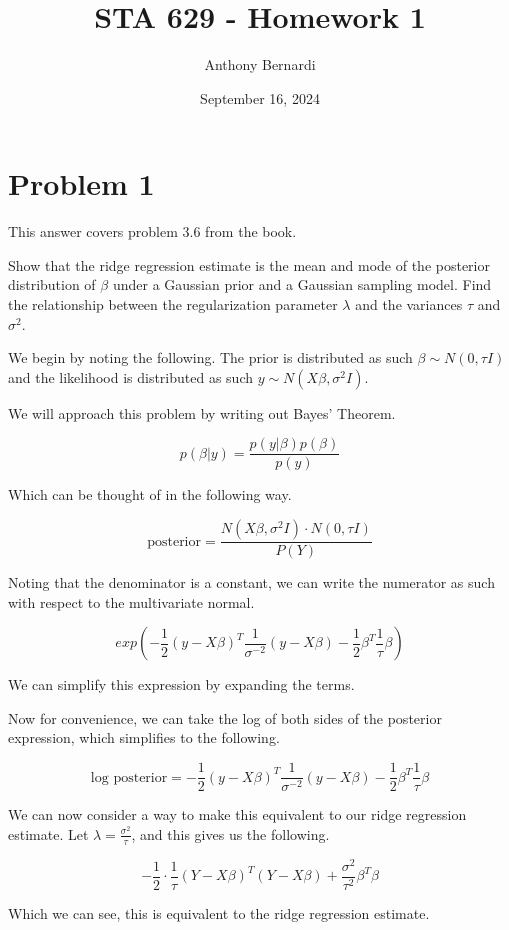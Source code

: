\documentclass[12pt, letterpaper]{article}
\title{STA 629 - Homework 1}
\author{Anthony Bernardi}
\date{September 16, 2024}
\begin{document}
\maketitle

\section{Problem 1} 

This answer covers problem 3.6 from the book. 

Show that the ridge regression estimate is the mean and mode of the posterior distribution of $\beta$ under a Gaussian prior and a Gaussian sampling model. Find the relationship between the regularization parameter $\lambda$ and the variances $\tau$ and $\sigma^2$. 

We begin by noting the following. The prior is distributed as such $\beta \sim N(0, \tau I)$ and the likelihood is distributed as such $y \sim N(X\beta, \sigma^2I)$.

We will approach this problem by writing out Bayes' Theorem. 

\[
p(\beta | y) = \frac{p(y | \beta) p(\beta)}{p(y)}
\]

Which can be thought of in the following way. 

\[
\text{posterior} = \frac{N(X\beta, \sigma^2 I) \cdot N(0, \tau I)}{P(Y)}
\] 

Noting that the denominator is a constant, we can write the numerator as such with respect to the multivariate normal. 

\[
exp(-\frac{1}{2} (y - X\beta)^T \frac{1}{\sigma^{-2}} (y - X\beta) - \frac{1}{2} \beta^T \frac{1}{\tau} \beta)
\]

We can simplify this expression by expanding the terms. 

Now for convenience, we can take the log of both sides of the posterior expression, which simplifies to the following.  

\[
\text{log posterior} = -\frac{1}{2} (y - X\beta)^T \frac{1}{\sigma^{-2}} (y - X\beta) - \frac{1}{2} \beta^T \frac{1}{\tau} \beta
\]

We can now consider a way to make this equivalent to our ridge regression estimate. Let $\lambda = \frac{\sigma^2}{\tau}$, and this gives us the following. 

\[
-\frac{1}{2} \cdot \frac{1}{\tau} (Y - X\beta)^T (Y - X\beta) + \frac{\sigma^2}{\tau^2} \beta^T \beta
\]

Which we can see, this is equivalent to the ridge regression estimate.
\end{document}
